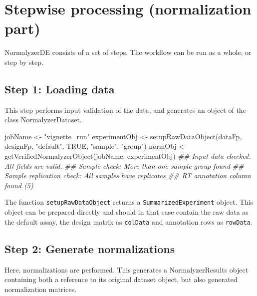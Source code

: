 \documentclass[]{article}
\newcommand{\hlnum}[1]{\textcolor[rgb]{0.816,0.125,0.439}{#1}}%
\newcommand{\hlstr}[1]{\textcolor[rgb]{0.251,0.627,0.251}{#1}}%
\newcommand{\hlcom}[1]{\textcolor[rgb]{0.502,0.502,0.502}{\textit{#1}}}%
\newcommand{\hlstd}[1]{\textcolor[rgb]{0.251,0.251,0.251}{#1}}%
\newenvironment{Shaded}{\begin{myshaded}}{\end{myshaded}}
\newcommand{\ConstantTok}[1]{\hlnum{#1}}
\newcommand{\StringTok}[1]{\hlstr{#1}}
\newcommand{\DocumentationTok}[1]{\hlcom{#1}}
\newcommand{\OtherTok}[1]{{#1}}
\newcommand{\FunctionTok}[1]{\hlstd{#1}}
\newcommand{\NormalTok}[1]{\hlstd{#1}}
\begin{document}
\hypertarget{stepwise-processing-normalization-part}{%
\section{Stepwise processing (normalization part)}\label{stepwise-processing-normalization-part}}

NormalyzerDE consists of a set of steps. The workflow can be run as a whole, or step by step.

\hypertarget{step-1-loading-data}{%
\subsection{Step 1: Loading data}\label{step-1-loading-data}}

This step performs input validation of the data, and generates an object of the class NormalyzerDataset.

\begin{Shaded}
\begin{Highlighting}[]
\NormalTok{jobName }\OtherTok{\textless{}{-}} \StringTok{"vignette\_run"}
\NormalTok{experimentObj }\OtherTok{\textless{}{-}} \FunctionTok{setupRawDataObject}\NormalTok{(dataFp, designFp, }\StringTok{"default"}\NormalTok{, }\ConstantTok{TRUE}\NormalTok{, }\StringTok{"sample"}\NormalTok{, }\StringTok{"group"}\NormalTok{)}
\NormalTok{normObj }\OtherTok{\textless{}{-}} \FunctionTok{getVerifiedNormalyzerObject}\NormalTok{(jobName, experimentObj)}
\DocumentationTok{\#\# Input data checked. All fields are valid.}
\DocumentationTok{\#\# Sample check: More than one sample group found}
\DocumentationTok{\#\# Sample replication check: All samples have replicates}
\DocumentationTok{\#\# RT annotation column found (5)}
\end{Highlighting}
\end{Shaded}

The function \texttt{setupRawDataObject} returns a \texttt{SummarizedExperiment} object.
This object can be prepared directly and should in that case contain the raw
data as the default assay, the design matrix as \texttt{colData} and annotation rows
as \texttt{rowData}.

\hypertarget{step-2-generate-normalizations}{%
\subsection{Step 2: Generate normalizations}\label{step-2-generate-normalizations}}

Here, normalizations are performed. This generates a NormalyzerResults object containing both a reference to its original dataset object, but also generated normalization matrices.
\end{document}
